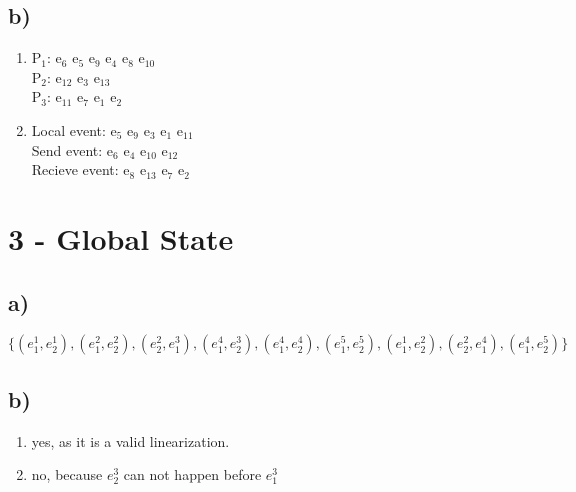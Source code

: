 \documentclass{scrartcl}
\begin{document}
\subsection*{b)}
\begin{enumerate}[label=(\roman*)]
	\item 
	P$_1$: e$_6$ e$_5$ e$_9$ e$_4$ e$_8$ e$_{10}$\\
	P$_2$: e$_{12}$ e$_3$ e$_{13}$\\
	P$_3$: e$_{11}$ e$_7$ e$_1$ e$_2$\\
	\item 
	Local event: e$_5$ e$_9$ e$_3$ e$_1$ e$_{11}$\\
	Send event: e$_6$ e$_4$ e$_{10}$ e$_{12}$\\
	Recieve event:  e$_8$ e$_{13}$ e$_7$ e$_2$\\
\end{enumerate}
\section*{3 - Global State}
\subsection*{a)}
$ \{(e^{1}_{1}, e^{1}_{2}), (e^{2}_{1}, e^{2}_{2}), (e^{2}_{2}, e^{3}_{1}), (e^{4}_{1}, e^{3}_{2}), (e^{4}_{1}, e^{4}_{2}), (e^{5}_{1}, e^{5}_{2}), (e^{1}_{1}, e^{2}_{2}), (e^{2}_{2}, e^{4}_{1}), (e^{4}_{1}, e^{5}_{2})\} $

\subsection*{b)}
\begin{enumerate}
	\item yes, as it is a valid linearization.
	\item no, because $ e_{2}^{3} $ can not happen before $ e_{1}^{3} $
\end{enumerate}
\end{document}
